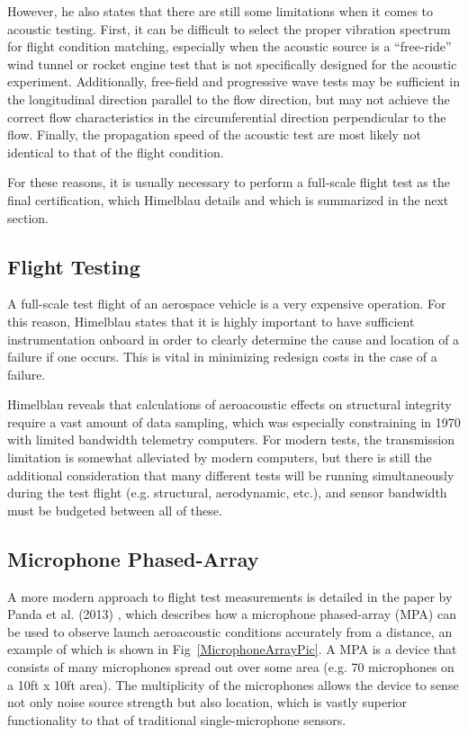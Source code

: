 \documentclass[]{aiaa-tc}%
\begin{document}
However, he also states that there are still some limitations when it comes to acoustic testing.  First, it can be difficult to select the proper vibration spectrum for flight condition matching, especially when the acoustic source is a ``free-ride'' wind tunnel or rocket engine test that is not specifically designed for the acoustic experiment.  Additionally, free-field and progressive wave tests may be sufficient in the longitudinal direction parallel to the flow direction, but may not achieve the correct flow characteristics in the circumferential direction perpendicular to the flow.  Finally, the propagation speed of the acoustic test are most likely not identical to that of the flight condition.

For these reasons, it is usually necessary to perform a full-scale flight test as the final certification, which Himelblau details and which is summarized in the next section.

\subsection{Flight Testing}

A full-scale test flight of an aerospace vehicle is a very expensive operation.  For this reason, Himelblau states that it is highly important to have sufficient instrumentation onboard in order to clearly determine the cause and location of a failure if one occurs.  This is vital in minimizing redesign costs in the case of a failure.

Himelblau reveals that calculations of aeroacoustic effects on structural integrity require a vast amount of data sampling, which was especially constraining in 1970 with limited bandwidth telemetry computers.  For modern tests, the transmission limitation is somewhat alleviated by modern computers, but there is still the additional consideration that many different tests will be running simultaneously during the test flight (e.g. structural, aerodynamic, etc.), and sensor bandwidth must be budgeted between all of these.


\subsection{Microphone Phased-Array}

A more modern approach to flight test measurements is detailed in the paper by Panda et al. (2013) \cite{MicrophonePhasedArray}, which describes how a microphone phased-array (MPA) can be used to observe launch aeroacoustic conditions accurately from a distance, an example of which is shown in Fig~\ref{MicrophoneArrayPic}.  A MPA is a device that consists of many microphones spread out over some area (e.g. 70 microphones on a 10ft x 10ft area).  The multiplicity of the microphones allows the device to sense not only noise source strength but also location, which is vastly superior functionality to that of traditional single-microphone sensors.
\end{document}
